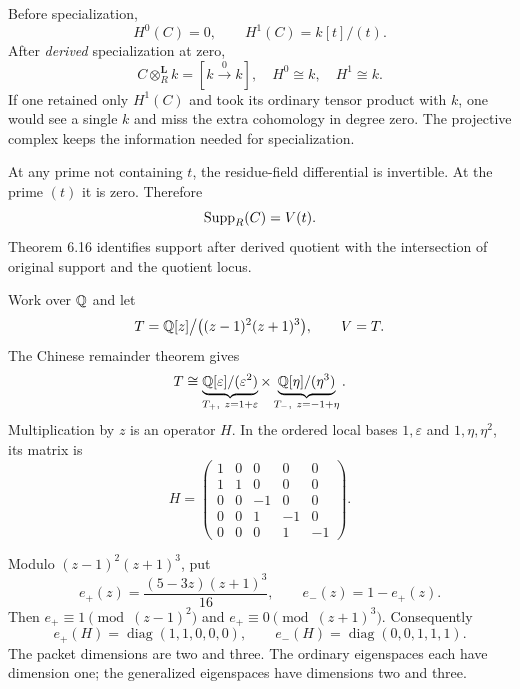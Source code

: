Before specialization,
\[
H^0(C)=0,\qquad H^1(C)=k[t]/(t).
\]
After \emph{derived} specialization at zero,
\[
C\otimes_R^{\mathbf L}k=[k\xrightarrow{0}k],
\quad H^0\cong k,\quad H^1\cong k.
\]
If one retained only $H^1(C)$ and took its ordinary tensor product with $k$, one would see a single $k$ and miss the extra cohomology in degree zero. The projective complex keeps the information needed for specialization.

At any prime not containing $t$, the residue-field differential is invertible. At the prime $(t)$ it is zero. Therefore
\[
\operatorname{Supp}_R(C)=V(t).
\]
Theorem 6.16 identifies support after derived quotient with the intersection of original support and the quotient locus.


Work over $\mathbb Q$ and let
\[
T=\mathbb Q[z]\big/\bigl((z-1)^2(z+1)^3\bigr),\qquad V=T.
\]
The Chinese remainder theorem gives
\[
T\cong \underbrace{\mathbb Q[\varepsilon]/(\varepsilon^2)}_{T_+,\ z=1+\varepsilon}
\times
\underbrace{\mathbb Q[\eta]/(\eta^3)}_{T_-,\ z=-1+\eta}.
\]
Multiplication by $z$ is an operator $H$. In the ordered local bases $1,\varepsilon$ and $1,\eta,\eta^2$, its matrix is
\[
H=\left(\begin{array}{cc|ccc}
1&0&0&0&0\\1&1&0&0&0\\\hline
0&0&-1&0&0\\0&0&1&-1&0\\0&0&0&1&-1
\end{array}\right).
\]


Modulo $(z-1)^2(z+1)^3$, put
\[
e_+(z)=\frac{(5-3z)(z+1)^3}{16},\qquad e_-(z)=1-e_+(z).
\]
Then $e_+\equiv1\pmod{(z-1)^2}$ and $e_+\equiv0\pmod{(z+1)^3}$. Consequently
\[
e_+(H)=\operatorname{diag}(1,1,0,0,0),\qquad
 e_-(H)=\operatorname{diag}(0,0,1,1,1).
\]
The packet dimensions are two and three. The ordinary eigenspaces each have dimension one; the generalized eigenspaces have dimensions two and three.

